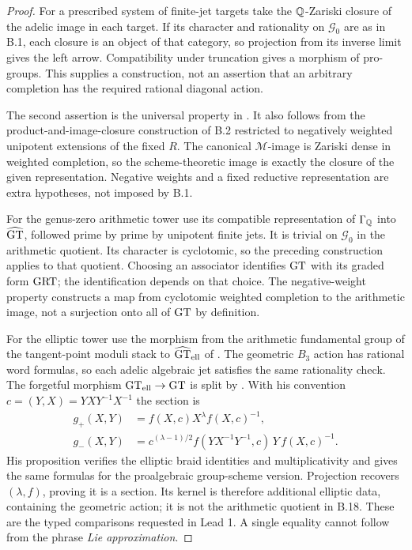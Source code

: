 \begin{proof}
For a prescribed system of finite-jet targets take the $\mathbb Q$-Zariski
closure of the adelic image in each target. If its character and
rationality on $\mathcal G_0$ are as in B.1, each closure is an
object of that category, so projection from its inverse limit gives
the left arrow. Compatibility under truncation gives a morphism
of pro-groups. This supplies a construction, not an assertion that
an arbitrary completion has the required rational diagonal action.

The second assertion is the universal property in
\citet[Definition 4.1 and Proposition 4.4]{HainMatsumoto2003}.
It also follows from the product-and-image-closure construction
of B.2 restricted to negatively weighted unipotent extensions
of the fixed $R$. The canonical $\mathcal M$-image is Zariski
dense in weighted completion, so the scheme-theoretic image is
exactly the closure of the given representation. Negative
weights and a fixed reductive representation are extra
hypotheses, not imposed by B.1.

For the genus-zero arithmetic tower use its compatible
representation of $\Gamma_\mathbb Q$ into $\widehat{\mathrm{GT}}$, followed
prime by prime by unipotent finite jets. It is trivial on
$\mathcal G_0$ in the arithmetic quotient. Its character is
cyclotomic, so the preceding construction applies to that
quotient. Choosing an associator identifies $\mathrm{GT}$ with its
graded form $\mathrm{GRT}$; the identification depends on that choice.
The negative-weight property constructs a map from cyclotomic
weighted completion to the arithmetic image, not a surjection
onto all of $\mathrm{GT}$ by definition.

For the elliptic tower use the morphism from the arithmetic
fundamental group of the tangent-point moduli stack to
$\widehat{\mathrm{GT}}_{\rm ell}$ of
\citet[Theorem 8.4 and Proposition 8.5]{Enriquez2014}.
The geometric $B_3$ action has rational word formulas, so
each adelic algebraic jet satisfies the same rationality check.
The forgetful morphism $\mathrm{GT}_{\rm ell}\to\mathrm{GT}$ is split by
\citet[Proposition 2.20]{Enriquez2014}. With his convention
$c=(Y,X)=YXY^{-1}X^{-1}$ the section is
\[
\begin{split}
 g_+(X,Y)&=f(X,c)X^\lambda f(X,c)^{-1},\\
 g_-(X,Y)&=c^{(\lambda-1)/2}
      f(YX^{-1}Y^{-1},c)\,Y\,f(X,c)^{-1}.
\end{split}
\]
His proposition verifies the elliptic braid identities and
multiplicativity and gives the same formulas for the
proalgebraic group-scheme version. Projection recovers
$(\lambda,f)$, proving it is a section. Its kernel is therefore
additional elliptic data, containing the geometric action;
it is not the arithmetic quotient in B.18. These are the
typed comparisons requested in Lead 1. A single equality
cannot follow from the phrase \emph{Lie approximation}.
\end{proof}

